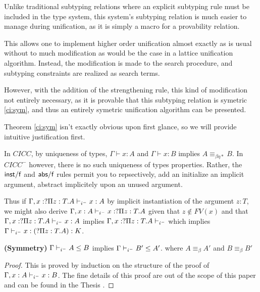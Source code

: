Unlike traditional subtyping relations where an explicit subtyping rule must be included in the type system,
this system's subtyping relation is much easier to manage during unification, as it is simply
a macro for a provability relation.  

This allows one to implement higher order unification almost exactly
as is usual without to much modification as would be the case in a lattice unification algorithm.  
Instead, the modification is made to the search procedure, and subtyping constraints 
are realized as search terms.  

However, with the addition of the strengthening rule, 
this kind of modification not entirely necessary, 
as it is provable that this subtyping relation is symetric \ref{ci:sym}, 
and thus an entirely symetric unification algorithm can be presented.

Theorem \ref{ci:sym} isn't exactly obvious upon first glance, 
so we will provide intuitive justification first.

In $CICC$, by uniqueness of types, 
$\Gamma \vdash x : A$ and 
$\Gamma \vdash x : B$ implies
$A \equiv_{\beta\eta*} B$.  
In $CICC^{-}$ however, there is no such uniqueness of 
types properties.  
Rather, the $\mathsf{inst/f}$ and $\mathsf{abs/f}$ 
rules permit you to repsectively,
add an initialize an implicit argument, 
abstract implicitely upon an unused argument. 

Thus if $\Gamma , x : ?\Pi z : T . A \vdash_{i^-} x : A$
by implicit instantiation of the argument $z:T$,
we might also
derive
$\Gamma , x : A \vdash_{i^-} x : ?\Pi z : T . A$
given that $z \notin FV(x)$ and that 
$\Gamma , x : ?\Pi z : T . A \vdash_{i^-} x : A$ 
implies $ \Gamma , x : ?\Pi z : T . A \vdash_{i^-}$ 
which implies $ \Gamma\vdash_{i^-} x : (?\Pi z : T . A) : K$.

\begin{theorem}
\textbf{(Symmetry)}
$\Gamma \vdash_{i^-} A \leq B $ implies 
$\Gamma \vdash_{i^-} B' \leq A' $. where $A \equiv_{\beta} A'$ and $B \equiv_{\beta} B'$
\label{ci:sym}
\end{theorem}

\begin{proof}

This is proved by induction on the structure of the proof
of $\Gamma, x : A \vdash_{i^-} x : B$.  
The fine details of this proof are out of the scope of this paper and can be found in the Thesis \citep{mirman}.

\end{proof}
